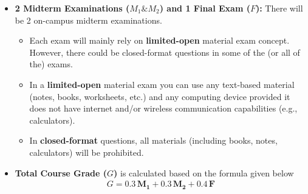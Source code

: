 \documentclass[11pt,oneside]{amsart}
\begin{document}
\begin{itemize}

\item \textbf{2 Midterm Examinations ($M_1 \& M_2$) and 1 Final Exam ($F$):} There
  will be 2 on-campus midterm examinations. 

\vspace{3pt}

\begin{itemize}

\item Each exam will mainly rely on \textbf{limited-open} material
  exam concept. However, there could be closed-format questions in some of the (or all of the) exams.

\item In a \textbf{limited-open} material exam you can
use any text-based material (notes, books, worksheets, etc.) and any computing
device provided it does not have internet and/or wireless communication capabilities 
(e.g., calculators).

\item In \textbf{closed-format} questions, all materials (including
 books, notes, calculators) will be prohibited. 

\end{itemize}

\vspace{6pt}

\item \textbf{Total Course Grade ($G$)} is calculated based on the
  formula given below
%
\begin{align*}
  G = 0.3 \, \mathbf{M_1} + 0.3 \, \mathbf{M_2} + 0.4 \, \mathbf{F} 
\end{align*}

\end{itemize}
\end{document}
